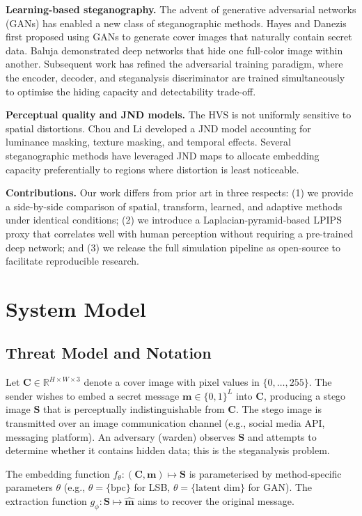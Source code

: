 \documentclass[conference]{IEEEtran}
\begin{document}
\textbf{Learning-based steganography.} The advent of generative adversarial networks (GANs) has enabled a new class of steganographic methods. Hayes and Danezis \cite{10} first proposed using GANs to generate cover images that naturally contain secret data. Baluja \cite{11} demonstrated deep networks that hide one full-color image within another. Subsequent work \cite{12,13} has refined the adversarial training paradigm, where the encoder, decoder, and steganalysis discriminator are trained simultaneously to optimise the hiding capacity and detectability trade-off.

\textbf{Perceptual quality and JND models.} The HVS is not uniformly sensitive to spatial distortions. Chou and Li \cite{14} developed a JND model accounting for luminance masking, texture masking, and temporal effects. Several steganographic methods \cite{15,16} have leveraged JND maps to allocate embedding capacity preferentially to regions where distortion is least noticeable.

\textbf{Contributions.} Our work differs from prior art in three respects: (1) we provide a side-by-side comparison of spatial, transform, learned, and adaptive methods under identical conditions; (2) we introduce a Laplacian-pyramid-based LPIPS proxy that correlates well with human perception without requiring a pre-trained deep network; and (3) we release the full simulation pipeline as open-source to facilitate reproducible research.

\section{System Model}
\label{sec:model}

\subsection{Threat Model and Notation}

Let $\mathbf{C} \in \mathbb{R}^{H \times W \times 3}$ denote a cover image with pixel values in $\{0,\dots,255\}$. The sender wishes to embed a secret message $\mathbf{m} \in \{0,1\}^L$ into $\mathbf{C}$, producing a stego image $\mathbf{S}$ that is perceptually indistinguishable from $\mathbf{C}$. The stego image is transmitted over an image communication channel (e.g., social media API, messaging platform). An adversary (warden) observes $\mathbf{S}$ and attempts to determine whether it contains hidden data; this is the steganalysis problem.

The embedding function $f_\theta: (\mathbf{C}, \mathbf{m}) \mapsto \mathbf{S}$ is parameterised by method-specific parameters $\theta$ (e.g., $\theta = \{\text{bpc}\}$ for LSB, $\theta = \{\text{latent dim}\}$ for GAN). The extraction function $g_\phi: \mathbf{S} \mapsto \hat{\mathbf{m}}$ aims to recover the original message.
\end{document}
